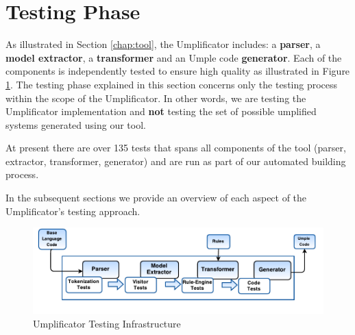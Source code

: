 \section{Testing Phase}
\label{sec:testingUmplificator}
As illustrated in Section \ref{chap:tool}, the Umplificator includes: a \textbf{parser}, a \textbf{model extractor}, a \textbf{transformer} and an Umple code \textbf{generator}. Each of the components is independently tested to ensure high quality as illustrated in Figure \ref{fig:testingPhase}. The testing phase explained in this section concerns only the testing process within the scope of the Umplificator.  In other words, we are testing the Umplificator implementation and \textbf{not} testing the set of possible umplified systems generated using our tool. 



At present there are over 135 tests that spans all components of the tool (parser, extractor, transformer, generator) and are run as part of our automated building process.

In the subsequent sections we provide an overview of each aspect of the Umplificator's testing approach. 

\begin{figure}[h]
\centering
\includegraphics[width=1\textwidth]{Figures/testingPhase.pdf} 
\caption{Umplificator Testing Infrastructure}
\label{fig:testingPhase}
\end{figure}

